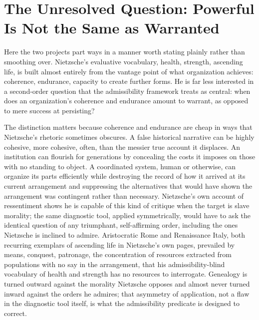 \documentclass[11pt]{article}
\begin{document}
\section*{The Unresolved Question: Powerful Is Not the Same as Warranted}

Here the two projects part ways in a manner worth stating plainly rather than smoothing over. Nietzsche's evaluative vocabulary, health, strength, ascending life, is built almost entirely from the vantage point of what organization achieves: coherence, endurance, capacity to create further forms. He is far less interested in a second-order question that the admissibility framework treats as central: when does an organization's coherence and endurance amount to warrant, as opposed to mere success at persisting?

The distinction matters because coherence and endurance are cheap in ways that Nietzsche's rhetoric sometimes obscures. A false historical narrative can be highly cohesive, more cohesive, often, than the messier true account it displaces. An institution can flourish for generations by concealing the costs it imposes on those with no standing to object. A coordinated system, human or otherwise, can organize its parts efficiently while destroying the record of how it arrived at its current arrangement and suppressing the alternatives that would have shown the arrangement was contingent rather than necessary. Nietzsche's own account of ressentiment shows he is capable of this kind of critique when the target is slave morality; the same diagnostic tool, applied symmetrically, would have to ask the identical question of any triumphant, self-affirming order, including the ones Nietzsche is inclined to admire. Aristocratic Rome and Renaissance Italy, both recurring exemplars of ascending life in Nietzsche's own pages, prevailed by means, conquest, patronage, the concentration of resources extracted from populations with no say in the arrangement, that his admissibility-blind vocabulary of health and strength has no resources to interrogate. Genealogy is turned outward against the morality Nietzsche opposes and almost never turned inward against the orders he admires; that asymmetry of application, not a flaw in the diagnostic tool itself, is what the admissibility predicate is designed to correct.
\end{document}
